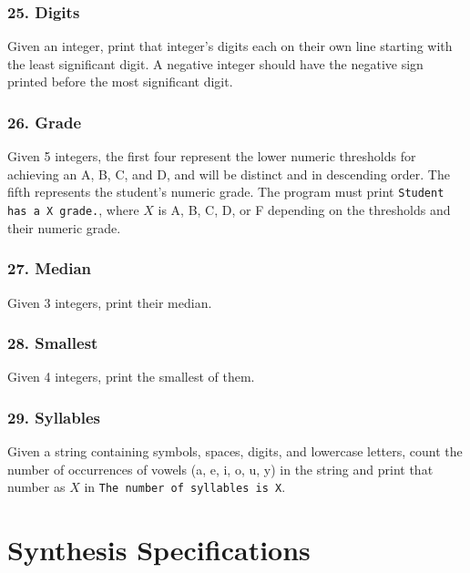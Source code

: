 \documentclass{sig-alternate}
\begin{document}
\subsubsection*{25. Digits}
Given an integer, print that integer's digits each on their own line starting with the least significant digit. A negative integer should have the negative sign printed before the most significant digit.

\subsubsection*{26. Grade}
Given 5 integers, the first four represent the lower numeric thresholds for achieving an A, B, C, and D, and will be distinct and in descending order. The fifth represents the student's numeric grade. The program must print \texttt{Student has a X grade.}, where $X$ is A, B, C, D, or F depending on the thresholds and their numeric grade.

\subsubsection*{27. Median}
Given 3 integers, print their median.

\subsubsection*{28. Smallest}
Given 4 integers, print the smallest of them.

\subsubsection*{29. Syllables}
Given a string containing symbols, spaces, digits, and lowercase letters, count the number of occurrences of vowels (a, e, i, o, u, y) in the string and print that number as $X$ in \texttt{The number of syllables is X}.

\section{Synthesis Specifications} \label{synthProbSpec}


\end{document}
